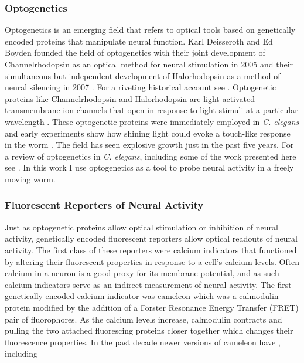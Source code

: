  

\subsubsection{Optogenetics}
Optogenetics is an emerging field that refers to optical tools based on genetically encoded proteins that manipulate neural function. Karl Deisseroth and Ed Boyden founded the field of optogenetics with their joint development of Channelrhodopsin as an optical method for neural stimulation in  2005 \citep{boyden_millisecond-timescale_2005} and their simultaneous but independent development of Halorhodopsin as a method of neural silencing in 2007 \citep{zhang_multimodal_2007, han_multiple-color_2007}.  For a riveting historical account see \citep{boyden_history_2011}. Optogenetic proteins like Channelrhodopsin and Halorhodopsin are light-activated transmembrane ion channels that open in response to light stimuli at a particular wavelength \citep{nagel_channelrhodopsin-2_2003, yizhar_optogenetics_2011, fenno_development_2011}. These optogenetic proteins were immediately employed  in \textit{C. elegans} and early experiments show how shining light could evoke a touch-like response in the worm  \citep{nagel_light_2005}.  The field has seen explosive growth  just in the past five years. For a review of optogenetics in \textit{C. elegans}, including some of the work presented here see \citep{xu_early_2011}. In this work I use optogenetics as a tool to probe neural activity in a freely moving worm. 

\subsubsection{Fluorescent Reporters of Neural Activity}
Just as optogenetic proteins allow optical stimulation or inhibition of neural activity,  genetically encoded fluorescent reporters allow optical readouts of neural activity. The first class of these reporters were calcium indicators that functioned by altering their fluorescent properties in response to a cell's calcium levels. Often calcium in a neuron is a good proxy for its membrane potential, and as such calcium indicators serve as an indirect measurement of neural activity.   The first genetically encoded calcium indicator was cameleon \citep{miyawaki_fluorescent_1997} which was a calmodulin protein modified by the addition of a Forster Resonance Energy Transfer (FRET) pair of fluorophores. As the calcium levels increase, calmodulin contracts and pulling the two attached fluorescing proteins closer together which changes their fluorescence properties. In the past decade newer versions of cameleon have , including  



